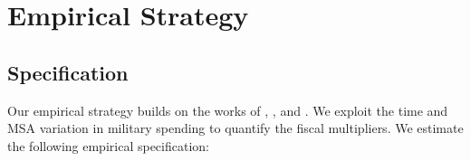 \documentclass[dv_diss_main.tex]{subfiles}
\begin{document}
\iffalse
In the fiscal multiplier literature, government spending is often thought as a homogeneous good \citep{}. Only recently, a few studies have explored some aspects of the heterogeneity in the fiscal policy. \cite{Cox2021} describe the heterogeneous characteristics of government spending. \cite{Auclert2018} and \cite{Hagedorn2019} study the importance of household heterogeneity on the transmission of fiscal policy. \cite{Dupor2021} investigate the effect of government spending on different types of consumption. Still, very little is known about the effect of heterogeneous government spending on the fiscal multiplier. This paper aims to fill this gap in the literature.

Fiscal Multiplier Literature: 

Heterogeneous Government Spending:

\fi




\section{Empirical Strategy}
\label{sec:emp_strategy}

\subsection{Specification}
Our empirical strategy builds on the works of \cite{Nakamura2014}, \cite{Dupor2017}, and \cite{Auerbach2020}. We exploit the time and MSA variation in military spending to
quantify the fiscal multipliers. We estimate the following empirical specification:
\end{document}
